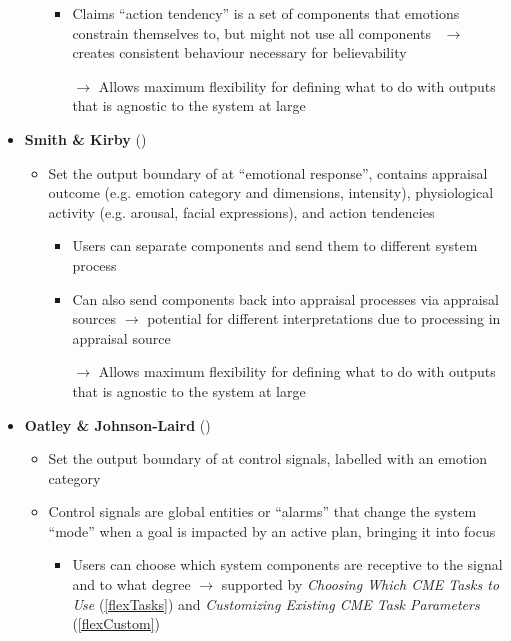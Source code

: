 \begin{itemize}
\begin{itemize}
\begin{itemize}
            \item Claims ``action tendency'' is a set of components that
            emotions constrain themselves to, but might not use all
            components~\citep[p.~198, 201]{ortony2002making} $\rightarrow$
            creates consistent behaviour necessary for
            believability~\citep[p.~200]{ortony2002making}

            \item [$\rightarrow$] Allows maximum flexibility for defining what
            to do with outputs that is agnostic to the system at large
        \end{itemize}
    \end{itemize}

    \item \textbf{Smith \& Kirby} (\strong)
    \begin{itemize}
        \item Set the output boundary of \progname{} at ``emotional response'',
        contains appraisal outcome (e.g. emotion category and dimensions,
        intensity), physiological activity (e.g. arousal, facial
        expressions), and action tendencies~\citep[p.~123, 130]{smith2001toward}
        \begin{itemize}
            \item Users can separate components and send them to different
            system process

            \item Can also send components back into appraisal processes via
            appraisal sources $\rightarrow$ potential for different
            interpretations due to processing in appraisal
            source~\citep[p.~99]{smith2000consequences}

            \item [$\rightarrow$] Allows maximum flexibility for defining what
            to do with outputs that is agnostic to the system at large
        \end{itemize}
    \end{itemize}

    \item \textbf{Oatley \& Johnson-Laird} (\strong)
    \begin{itemize}
        \item Set the output boundary of \progname{} at control signals,
        labelled with an emotion category~\citep[p.~50, 54]{oatley1992best}

        \item Control signals are global entities or ``alarms'' that change the
        system ``mode'' when a goal is impacted by an active plan, bringing it
        into focus~\citep[p.~62--63]{oatley1992best}
        \begin{itemize}
            \item Users can choose which system components are receptive to the
            signal and to what degree $\rightarrow$ supported by
            \textit{Choosing Which CME Tasks to Use} (\ref{flexTasks}) and
            \textit{Customizing Existing CME Task Parameters} (\ref{flexCustom})


\end{itemize}
\end{itemize}
\end{itemize}
